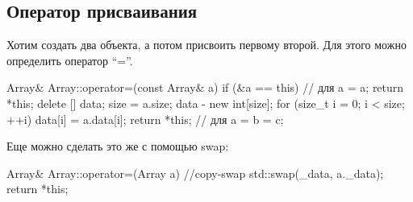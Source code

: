 \subsection{Оператор присваивания}
Хотим создать два объекта, а потом присвоить первому второй. Для этого можно определить оператор ``=''.
\begin{ccode}
Array& Array::operator=(const Array& a) {
    if (&a == this) // для a = a;
	return *this;
    delete [] data;
    size = a.size;
    data - new int[size];
    for (size_t i = 0; i < size; ++i) 
	data[i] = a.data[i];
    return *this; // для a = b = c;
}
\end{ccode}
Еще можно сделать это же с помощью swap:
\begin{ccode}
Array& Array::operator=(Array a) { //copy-swap
    std::swap(_data, a._data);
    return *this;
}
\end{ccode}

